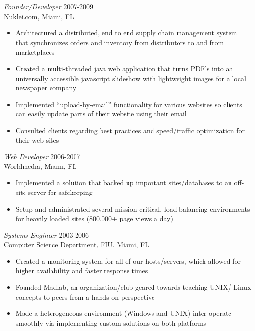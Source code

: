 \documentclass[margin]{res}
\begin{document}
\begin{resume}
                   
                   {\sl Founder/Developer } \hfill 2007-2009 \\
                   Nuklei.com, Miami, FL
                   \begin{itemize}  \itemsep -2pt %
                   \item Architectured a distributed, end to end supply chain management system that synchronizes orders
                     and inventory from distributors to and from marketplaces
                   \item Created a multi-threaded java web application that turns PDF's into an
                     universally accessible javascript slideshow with lightweight images for a local newspaper
                     company
                   \item Implemented ``upload-by-email'' functionality for various websites so clients can easily 
                     update parts of their website using their email
                   \item Consulted clients regarding best practices and speed/traffic optimization for their
                     web sites
                     
                   \end{itemize}
                   
                   {\sl Web Developer} \hfill 2006-2007 \\
                   Worldmedia, Miami, FL
                   \begin{itemize}  \itemsep -2pt %
                   \item Implemented a solution that backed up important sites/databases
                     to an off-site server for safekeeping
                   \item Setup and administrated several mission critical, load-balancing
                     environments for heavily loaded sites (800,000+ page views a day)
                   \end{itemize}

                   {\sl Systems Engineer} \hfill            2003-2006 \\
                   Computer Science Department, FIU, Miami, FL
                   \begin{itemize}  \itemsep -2pt %
                   \item Created a monitoring system for all of our hosts/servers, which allowed
                     for higher availability and faster response times
                   \item Founded Madlab, an organization/club geared towards teaching UNIX/
                     Linux concepts to peers from a hands-on perspective
                   \item Made a heterogeneous environment (Windows and UNIX) inter
                     operate smoothly via implementing custom solutions on both platforms
                   \end{itemize} 
                   

\end{resume}
\end{document}
